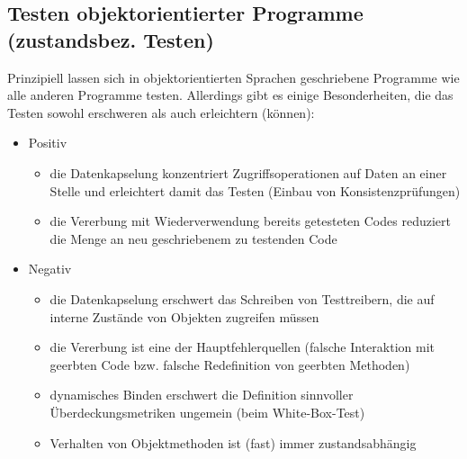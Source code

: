 \subsection{Testen objektorientierter Programme (zustandsbez. Testen)}
Prinzipiell lassen sich in objektorientierten Sprachen geschriebene Programme wie alle anderen Programme testen. Allerdings gibt es einige Besonderheiten, die das Testen sowohl erschweren als auch erleichtern (können):
\begin{itemize}
	\item Positiv
	\begin{itemize}
		\item die Datenkapselung konzentriert Zugriffsoperationen auf Daten an einer Stelle und erleichtert damit das Testen (Einbau von Konsistenzprüfungen)
		\item die Vererbung mit Wiederverwendung bereits getesteten Codes reduziert die Menge an neu geschriebenem zu testenden Code
	\end{itemize}
	\item Negativ
	\begin{itemize}
		\item die Datenkapselung erschwert das Schreiben von Testtreibern, die auf interne Zustände von Objekten zugreifen müssen
		\item die Vererbung ist eine der Hauptfehlerquellen (falsche Interaktion mit geerbten Code bzw. falsche Redefinition von geerbten Methoden)
		\item dynamisches Binden erschwert die Definition sinnvoller Überdeckungsmetriken ungemein (beim White-Box-Test)
		\item Verhalten von Objektmethoden ist (fast) immer zustandsabhängig
	\end{itemize}
\end{itemize}

